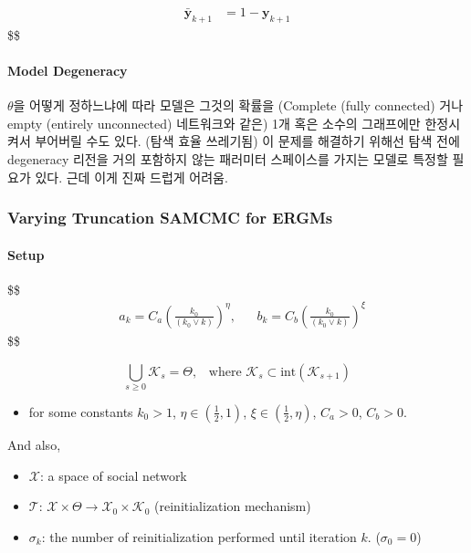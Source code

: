\documentclass[
]{book}
\providecommand{\tightlist}{%
  \setlength{\itemsep}{0pt}\setlength{\parskip}{0pt}}
\begin{document}
{{{\begin{align}
\\

\mathbf {\bar y}_{k+1} &= 1- \mathbf y_{k+1} 

\end{align}
\$\$

\hypertarget{model-degeneracy-1}{%
\paragraph{Model Degeneracy}\label{model-degeneracy-1}}

\(\theta\)을 어떻게 정하느냐에 따라 모델은 그것의 확률을 (Complete (fully connected) 거나 empty (entirely unconnected) 네트워크와 같은) 1개 혹은 소수의 그래프에만 한정시켜서 부어버릴 수도 있다. (탐색 효율 쓰레기됨) 이 문제를 해결하기 위해선 탐색 전에 degeneracy 리전을 거의 포함하지 않는 패러미터 스페이스를 가지는 모델로 특정할 필요가 있다. 근데 이게 진짜 드럽게 어려움.

\hypertarget{varying-truncation-samcmc-for-ergms}{%
\subsubsection{Varying Truncation SAMCMC for ERGMs}\label{varying-truncation-samcmc-for-ergms}}

\hypertarget{setup}{%
\paragraph{Setup}\label{setup}}

\$\$
\begin{align}

&a_k = C_a \left( \frac{k_0}{(k_0 \vee k)}\right)^\eta, &&b_k = C_b \left( \frac{k_0}{(k_0 \vee k)}\right)^\xi \tag{C_1, set}

\end{align}
\$\$

\[
\bigcup_{s \ge 0} \mathcal K_s = \Theta, \; \; \; \text{where } \mathcal K_s \subset \text{int}(\mathcal K_{s+1}) \tag{C_2}
\]

\begin{itemize}
\tightlist
\item
  for some constants \(k_0>1\), \(\eta \in (\frac{1}{2},1)\), \(\xi \in (\frac{1}{2},\eta)\), \(C_a > 0\), \(C_b >0\).
\end{itemize}

And also,

\begin{itemize}
\item
  \(\mathcal X\): a space of social network
\item
  \(\mathcal T\): \(\mathcal X \times \Theta \rightarrow \mathcal X_0 \times \mathcal K_0\) (reinitialization mechanism)
\item
  \(\sigma_k\): the number of reinitialization performed until iteration \(k\). (\(\sigma_0 = 0\))
\end{itemize}

}}}
\end{document}
